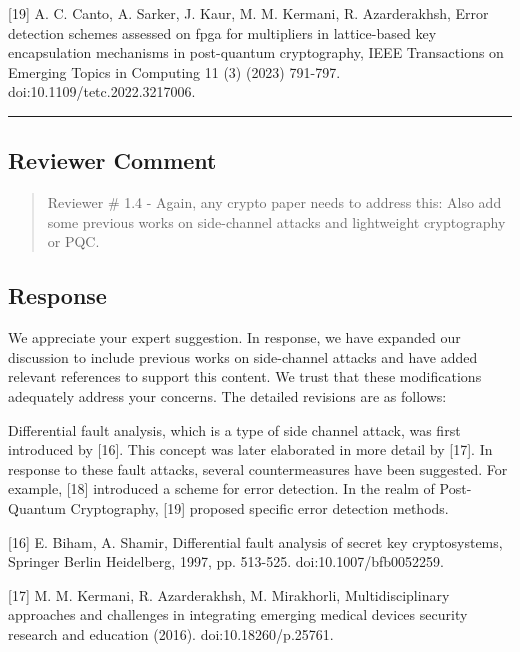 [19] A. C. Canto, A. Sarker, J. Kaur, M. M. Kermani, R. Azarderakhsh, Error detection schemes assessed on fpga for multipliers in lattice-based key encapsulation mechanisms in post-quantum cryptography, IEEE Transactions on Emerging Topics in Computing 11 (3) (2023) 791-797. doi:10.1109/tetc.2022.3217006.

\color{black}

\noindent\rule{\linewidth}{2.0pt}

\subsection{Reviewer Comment}
\begin{mdframed}
	\begin{quote}
		Reviewer \# 1.4 - Again, any crypto paper needs to address this: Also add some previous works on side-channel attacks and lightweight cryptography or PQC.
	\end{quote}
\end{mdframed}

\subsection{Response}

We appreciate your expert suggestion. In response, we have expanded our discussion to include previous works on side-channel attacks and have added relevant references to support this content. We trust that these modifications adequately address your concerns. The detailed revisions are as follows:

\color{blue}

Differential fault analysis, which is a type of side channel attack, was first introduced by [16]. This concept was later elaborated in more detail by [17]. In response to these fault attacks, several countermeasures have been suggested. For example, [18] introduced a scheme for error detection. In the realm of Post-Quantum Cryptography, [19] proposed specific error detection methods.

	[16] E. Biham, A. Shamir, Differential fault analysis of secret key cryptosystems, Springer Berlin Heidelberg, 1997, pp. 513-525. doi:10.1007/bfb0052259.


[17] M. M. Kermani, R. Azarderakhsh, M. Mirakhorli, Multidisciplinary approaches and challenges in integrating emerging medical devices security research and education (2016). \linebreak doi:10.18260/p.25761.


